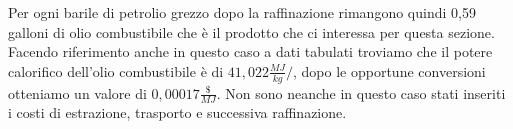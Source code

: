 Per ogni barile di petrolio grezzo dopo la raffinazione rimangono quindi 0,59 galloni di olio combustibile che è il prodotto che ci interessa per questa sezione.
Facendo riferimento anche in questo caso a dati tabulati troviamo che il potere calorifico dell'olio combustibile è di $41,022 \frac{MJ}{kg}/$, dopo le opportune conversioni otteniamo un valore di $0,00017\frac{\$}{MJ}$.
Non sono neanche in questo caso stati inseriti i costi di estrazione, trasporto e successiva raffinazione.
